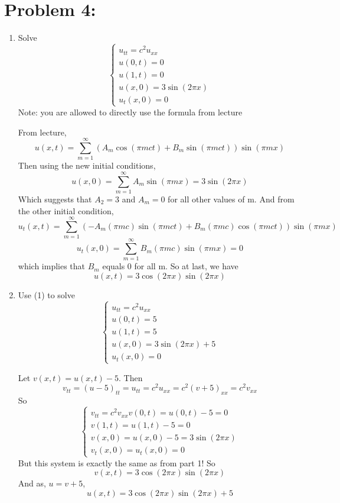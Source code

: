 \documentclass[12pt]{article}
\begin{document}
\section*{Problem 4:}
\begin{enumerate}
    \item Solve 
    \[\begin{cases}
        u_{tt} = c^2u_{xx}\\
        u(0, t) = 0\\
        u(1, t) = 0\\
        u(x, 0) = 3\sin(2\pi x)\\
        u_t(x, 0) = 0
    \end{cases}\]
    Note: you are allowed to directly use the formula from lecture

    \color{blue} 
    From lecture,
    \[u(x, t) = \sum_{m=1}^\infty (A_m\cos(\pi m ct) + B_m\sin(\pi mct)) \sin(\pi m x)\]
    Then using the new initial conditions,
    \[u(x, 0) = \sum_{m=1}^\infty A_m\sin(\pi m x) = 3\sin(2\pi x)\]
    Which suggests that $A_2 = 3$ and $A_m = 0$ for all other values of m. And from the other initial condition, 
    \[u_t(x, t) = \sum_{m=1}^\infty (-A_m(\pi mc)\sin(\pi m ct) + B_m(\pi mc)\cos(\pi mct))\sin(\pi m x)\]
    \[u_t(x, 0) = \sum_{m=1}^\infty B_m(\pi mc)\sin(\pi m x) = 0\]
    which implies that $B_m$ equals 0 for all m. So at last, we have 
    \[\boxed{u(x, t) = 3\cos(2\pi x)\sin(2\pi x)}\]
    \color{black}
    \item Use (1) to solve 
    \[\begin{cases}
        u_{tt} = c^2u_{xx}\\
        u(0, t) = 5\\
        u(1, t) = 5\\
        u(x, 0) = 3\sin(2\pi x) + 5\\
        u_t(x, 0) = 0
    \end{cases}\]

    \color{blue}
    Let $v(x, t) = u(x, t) - 5$. Then 
    \[v_{tt} = (u - 5)_{tt} = u_{tt} = c^2u_{xx} = c^2(v + 5)_{xx} = c^2v_{xx}\]
    So 
    \[\begin{cases}
        v_{tt} = c^2v_{xx}
        v(0, t) = u(0, t) - 5 = 0\\
        v(1, t) = u(1, t) - 5 = 0\\
        v(x, 0) = u(x, 0) - 5 = 3\sin(2\pi x)\\
        v_t(x, 0) = u_t(x, 0) = 0
   \end{cases}\]
    But this system is exactly the same as from part 1! So 
    \[v(x, t) = 3\cos(2\pi x)\sin(2\pi x)\]
    And as, $u = v + 5$, 
    \[\boxed{u(x, t) = 3\cos(2\pi x)\sin(2\pi x) + 5}\]
   \color{black}


\end{enumerate}
\end{document}
